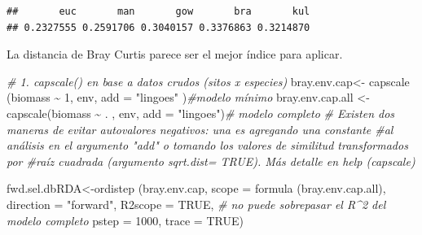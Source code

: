 \documentclass[
]{book}
\newenvironment{Shaded}{\begin{snugshade}}{\end{snugshade}}
\newcommand{\AttributeTok}[1]{\textcolor[rgb]{0.77,0.63,0.00}{#1}}
\newcommand{\CommentTok}[1]{\textcolor[rgb]{0.56,0.35,0.01}{\textit{#1}}}
\newcommand{\ConstantTok}[1]{\textcolor[rgb]{0.00,0.00,0.00}{#1}}
\newcommand{\DecValTok}[1]{\textcolor[rgb]{0.00,0.00,0.81}{#1}}
\newcommand{\FunctionTok}[1]{\textcolor[rgb]{0.00,0.00,0.00}{#1}}
\newcommand{\NormalTok}[1]{#1}
\newcommand{\OtherTok}[1]{\textcolor[rgb]{0.56,0.35,0.01}{#1}}
\newcommand{\SpecialCharTok}[1]{\textcolor[rgb]{0.00,0.00,0.00}{#1}}
\newcommand{\StringTok}[1]{\textcolor[rgb]{0.31,0.60,0.02}{#1}}
\begin{document}
\begin{verbatim}
##       euc       man       gow       bra       kul 
## 0.2327555 0.2591706 0.3040157 0.3376863 0.3214870
\end{verbatim}

La distancia de Bray Curtis parece ser el mejor índice para aplicar.

\begin{Shaded}
\begin{Highlighting}[]
\CommentTok{\# 1. capscale() en base a datos crudos (sitos x especies)}
\NormalTok{bray.env.cap}\OtherTok{\textless{}{-}} \FunctionTok{capscale}\NormalTok{ (biomass }\SpecialCharTok{\textasciitilde{}} \DecValTok{1}\NormalTok{, env, }\AttributeTok{add =} \StringTok{"lingoes"}\NormalTok{ )}\CommentTok{\#modelo mínimo}
\NormalTok{bray.env.cap.all }\OtherTok{\textless{}{-}} \FunctionTok{capscale}\NormalTok{(biomass }\SpecialCharTok{\textasciitilde{}}\NormalTok{ . , env, }\AttributeTok{add =} \StringTok{"lingoes"}\NormalTok{)}\CommentTok{\# modelo completo}
\CommentTok{\# Existen dos maneras de evitar autovalores negativos: una es agregando una constante \#al análisis en el argumento "add" o tomando los valores de similitud transformados por \#raíz cuadrada (argumento sqrt.dist= TRUE). Más detalle en help (capscale)}

\NormalTok{fwd.sel.dbRDA}\OtherTok{\textless{}{-}}\FunctionTok{ordistep}\NormalTok{ (bray.env.cap, }\AttributeTok{scope =} \FunctionTok{formula}\NormalTok{ (bray.env.cap.all), }\AttributeTok{direction =} \StringTok{"forward"}\NormalTok{, }\AttributeTok{R2scope =} \ConstantTok{TRUE}\NormalTok{, }\CommentTok{\# no puede sobrepasar el R\^{}2 del modelo completo}
\AttributeTok{pstep =} \DecValTok{1000}\NormalTok{,}
\AttributeTok{trace =} \ConstantTok{TRUE}\NormalTok{)}
\end{Highlighting}
\end{Shaded}
\end{document}
